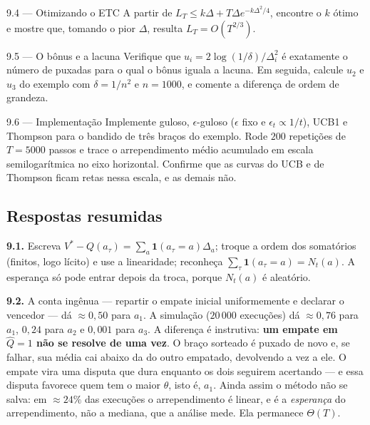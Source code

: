 \documentclass[11pt, a4paper]{article}
\newcommand{\Qhat}{\widehat{Q}}
\newcommand{\Nc}{N}
\newcommand{\gap}{\Delta}
\newcommand{\one}{\mathbf{1}}
\newcommand{\Reg}{L}
\begin{document}
\begin{exbox}{9.4 --- Otimizando o ETC}
A partir de $\Reg_T \le k\gap + T\gap e^{-k\gap^2/4}$, encontre o $k$ ótimo e
mostre que, tomando o pior $\gap$, resulta $\Reg_T = O(T^{2/3})$.
\end{exbox}

\begin{exbox}{9.5 --- O bônus e a lacuna}
Verifique que $u_i = 2\log(1/\delta)/\gap_i^2$ é exatamente o número de
puxadas para o qual o bônus iguala a lacuna. Em seguida, calcule $u_2$ e
$u_3$ do exemplo com $\delta = 1/n^2$ e $n = 1000$, e comente a diferença de
ordem de grandeza.
\end{exbox}

\begin{exbox}{9.6 --- Implementação}
Implemente guloso, $\epsilon$-guloso ($\epsilon$ fixo e $\epsilon_t \propto
1/t$), UCB1 e Thompson para o bandido de três braços do exemplo. Rode $200$
repetições de $T = 5000$ passos e trace o arrependimento médio acumulado em
escala semilogarítmica no eixo horizontal. Confirme que as curvas do UCB e de
Thompson ficam retas nessa escala, e as demais não.
\end{exbox}

\subsection*{Respostas resumidas}

\textbf{9.1.} Escreva $V^{*}-Q(a_\tau) = \sum_a \one(a_\tau = a)\gap_a$;
troque a ordem dos somatórios (finitos, logo lícito) e use a linearidade;
reconheça $\sum_\tau \one(a_\tau = a) = \Nc_t(a)$. A esperança só pode entrar
depois da troca, porque $\Nc_t(a)$ é aleatório.

\textbf{9.2.} A conta ingênua --- repartir o empate inicial uniformemente e
declarar o vencedor --- dá $\approx 0{,}50$ para $a_1$. A simulação
($20\,000$ execuções) dá $\approx 0{,}76$ para $a_1$, $0{,}24$ para $a_2$ e
$0{,}001$ para $a_3$. A diferença é instrutiva: \textbf{um empate em
$\Qhat = 1$ não se resolve de uma vez}. O braço sorteado é puxado de novo e,
se falhar, sua média cai abaixo da do outro empatado, devolvendo a vez a
ele. O empate vira uma disputa que dura enquanto os dois seguirem
acertando --- e essa disputa favorece quem tem o maior $\theta$, isto é,
$a_1$. Ainda assim o método não se salva: em $\approx 24\%$ das execuções o
arrependimento é linear, e é a \emph{esperança} do arrependimento, não a
mediana, que a análise mede. Ela permanece $\Theta(T)$.
\end{document}
